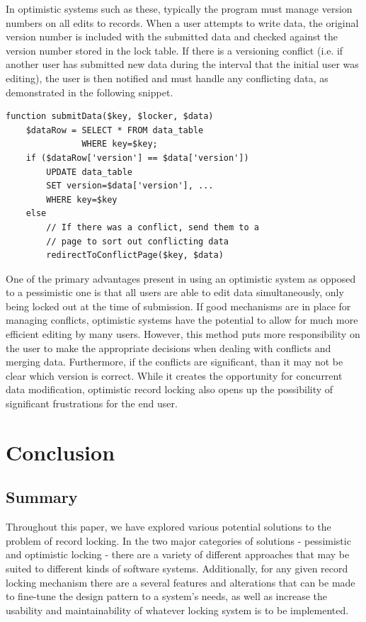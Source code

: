 \documentclass[12pt]{article}
\begin{document}
In optimistic systems such as these, typically the program must manage version numbers on all edits to records. When a user attempts to write data, the original version number is included with the submitted data and checked against the version number stored in the lock table. If there is a versioning conflict (i.e. if another user has submitted new data during the interval that the initial user was editing), the user is then notified and must handle any conflicting data, as demonstrated in the following snippet.

\newpage

\begin{framed}
\begin{spacing}{1.0}
\begin{verbatim}
function submitData($key, $locker, $data)
    $dataRow = SELECT * FROM data_table 
               WHERE key=$key;
    if ($dataRow['version'] == $data['version'])
        UPDATE data_table
        SET version=$data['version'], ...
        WHERE key=$key
    else
        // If there was a conflict, send them to a
        // page to sort out conflicting data
        redirectToConflictPage($key, $data)

\end{verbatim}
\end{spacing}
\end{framed}

One of the primary advantages present in using an optimistic system as opposed to a pessimistic one is that all users are able to edit data simultaneously, only being locked out at the time of submission. If good mechanisms are in place for managing conflicts, optimistic systems have the potential to allow for much more efficient editing by many users. However, this method puts more responsibility on the user to make the appropriate decisions when dealing with conflicts and merging data. Furthermore, if the conflicts are significant, than it may not be clear which version is correct. While it creates the opportunity for concurrent data modification, optimistic record locking also opens up the possibility of significant frustrations for the end user.

\newpage
\section{Conclusion}

\subsection{Summary}
Throughout this paper, we have explored various potential solutions to the problem of record locking. In the two major categories of solutions - pessimistic and optimistic locking - there are a variety of different approaches that may be suited to different kinds of software systems. Additionally, for any given record locking mechanism there are a several features and alterations that can be made to fine-tune the design pattern to a system's needs, as well as increase the usability and maintainability of whatever locking system is to be implemented.
\end{document}
